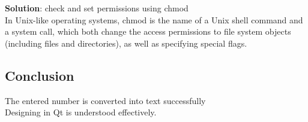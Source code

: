 \documentclass[paper=a4, fontsize=11pt]{scrartcl} %
\numberwithin{equation}{section} %
\numberwithin{figure}{section} %
\numberwithin{table}{section} %
\begin{document}
\textbf{Solution}: check and set permissions using chmod\\
In Unix-like operating systems, chmod is the name of a Unix shell command and a system call, which both change the access permissions to file system objects (including files and directories), as well as specifying special flags.


\subsection{Conclusion}
The entered number is converted into text successfully\\
Designing in Qt is understood effectively.\
\end{document}

